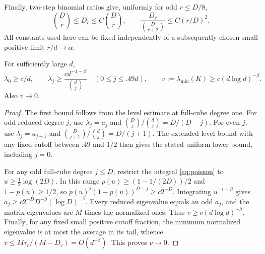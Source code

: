 Finally, two-step binomial ratios give, uniformly for odd $r\le D/8$,
\begin{equation}\label{eq:dimensionratios}
 \binom Dr\le D_r\le C\binom Dr,
 \qquad \frac{D_r}{\binom D{r+2}}\le C(r/D)^2.
\end{equation}
All constants used here can be fixed independently of a subsequently
chosen small positive limit $r/d\to\alpha$.

\begin{corollary}\label{cor:lower-spectrum}
For sufficiently large $d$,
\[
 \lambda_0\ge c/d,\qquad
 \lambda_j\ge \frac{c d^{-1-\beta}}{\binom dj}\quad(0\le j\le .49d),
 \qquad v:=\lambda_{\min}(K)\ge c(d\log d)^{-\beta}.
\]
Also $v\to0$.
\end{corollary}
\begin{proof}
The first bound follows from the level estimate at full-cube degree one.
For odd reduced degree $j$, use $\lambda_j=a_j$ and
$\binom Dj/\binom dj=D/(D-j)$. For even $j$, use
$\lambda_j=a_{j+1}$ and
$\binom D{j+1}/\binom dj=D/(j+1)$.
The extended level bound with any fixed cutoff between $.49$ and $1/2$
then gives the stated uniform lower bound, including $j=0$.

For any odd full-cube degree $j\le D$, restrict the integral
\eqref{eq:poisson} to $u\ge\tfrac12\log(2D)$. In this range
$p(u)\ge(1-1/(2D))/2$ and $1-p(u)\ge1/2$, so
$p(u)^j(1-p(u))^{D-j}\ge c2^{-D}$. Integrating $u^{-1-\beta}$ gives
$a_j\ge c2^{-D}D^{-\beta}(\log D)^{-\beta}$.
Every reduced eigenvalue equals an odd $a_j$, and the matrix eigenvalues
are $M$ times the normalized ones. Thus $v\ge c(d\log d)^{-\beta}$.
Finally, for any fixed small positive cutoff fraction, the minimum
normalized eigenvalue is at most the average in its tail, whence
$v\le M\tau_r/(M-D_r)=O(d^{-\beta})$. This proves $v\to0$.
\end{proof}
